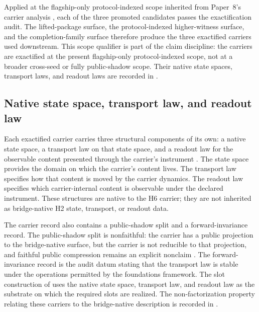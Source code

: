 \documentclass[11pt]{article}
\newcommand{\OldLayer}{H2}
\newcommand{\NewLayer}{H6}
\newcommand{\PaperEight}{Paper~8}
\theoremstyle{definition}
\begin{document}
Applied at the flagship-only protocol-indexed scope inherited from
\PaperEight{}'s carrier analysis \cite{Tsiokos2026CarrierToEvent}, each of the
three promoted candidates passes the exactification audit.  The lifted-package
surface, the protocol-indexed higher-witness surface, and the completion-family
surface therefore produce the three exactified carriers used downstream.  This
scope qualifier is part of the claim discipline: the carriers are exactified at
the present flagship-only protocol-indexed scope, not at a broader cross-seed
or fully public-shadow scope.  Their native state spaces, transport laws, and
readout laws are recorded in .

\subsection{Native state space, transport law, and readout law}\label{subsec:native-state-transport-readout}

Each exactified carrier carries three structural components of its own: a native
state space, a transport law on that state space, and a readout law for the
observable content presented through the carrier's instrument
\cite{Tsiokos2026CarrierExactification,Tsiokos2026FoundationsII}.  The state
space provides the domain on which the carrier's content lives.  The transport
law specifies how that content is moved by the carrier dynamics.  The readout
law specifies which carrier-internal content is observable under the declared
instrument.  These structures are native to the \NewLayer{} carrier; they are
not inherited as bridge-native \OldLayer{} state, transport, or readout data.

The carrier record also contains a public-shadow split and a forward-invariance
record.  The public-shadow split is nonfaithful: the carrier has a public
projection to the bridge-native surface, but the carrier is not reducible to
that projection, and faithful public compression remains an explicit nonclaim
\cite{Tsiokos2026CarrierExactification}.  The forward-invariance record is the
audit datum stating that the transport law is stable under the operations
permitted by the foundations framework.  The slot construction of
 uses the native state space, transport law, and
readout law as the substrate on which the required slots are realized.  The
non-factorization property relating these carriers to the bridge-native
description is recorded in .
\end{document}
